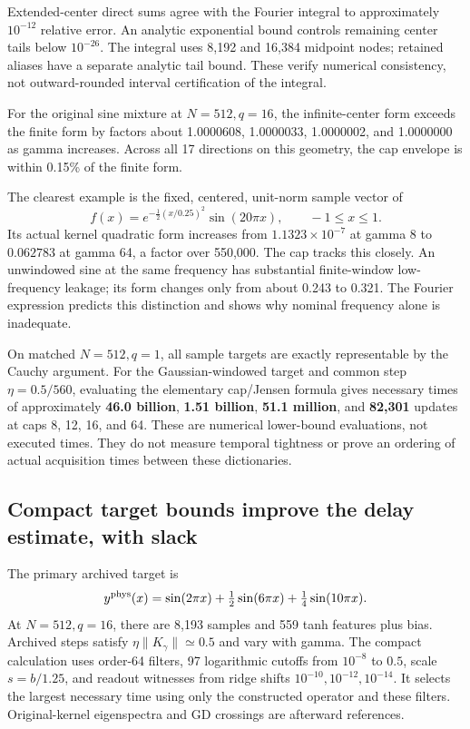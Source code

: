 \documentclass[11pt]{article}
\theoremstyle{definition}
\begin{document}
Extended-center direct sums agree with the Fourier integral to
approximately $10^{-12}$ relative error. An analytic exponential bound
controls remaining center tails below $10^{-26}$. The integral uses
8,192 and 16,384 midpoint nodes; retained aliases have a separate
analytic tail bound. These verify numerical consistency, not
outward-rounded interval certification of the integral.

For the original sine mixture at $N=512,q=16$, the infinite-center form
exceeds the finite form by factors about 1.0000608, 1.0000033,
1.0000002, and 1.0000000 as gamma increases. Across all 17 directions
on this geometry, the cap envelope is within 0.15\% of the finite form.

The clearest example is the fixed, centered, unit-norm sample vector of
\[
f(x)=e^{-\frac12(x/0.25)^2}\sin(20\pi x),\qquad -1\le x\le1.
\]
Its actual kernel quadratic form increases from $1.1323\times10^{-7}$
at gamma 8 to $0.062783$ at gamma 64, a factor over 550,000. The cap
tracks this closely. An unwindowed sine at the same frequency has
substantial finite-window low-frequency leakage; its form changes only
from about 0.243 to 0.321. The Fourier expression predicts this
distinction and shows why nominal frequency alone is inadequate.

On matched $N=512,q=1$, all sample targets are exactly representable
by the Cauchy argument. For the Gaussian-windowed target and common
step $\eta=0.5/560$, evaluating the elementary cap/Jensen formula gives
necessary times of approximately \textbf{46.0 billion}, \textbf{1.51
billion}, \textbf{51.1 million}, and \textbf{82,301} updates at caps
8, 12, 16, and 64. These are numerical lower-bound evaluations, not
executed times. They do not measure temporal tightness or prove an
ordering of actual acquisition times between these dictionaries.

\subsection*{Compact target bounds improve the delay estimate, with slack}
The primary archived target is
\[
y^{\rm phys}(x)=\sin(2\pi x)+\tfrac12\sin(6\pi x)+\tfrac14\sin(10\pi x).
\]
At $N=512,q=16$, there are 8,193 samples and 559 tanh features plus
bias. Archived steps satisfy $\eta\|K_\gamma\|\simeq0.5$ and vary with
gamma. The compact calculation uses order-64 filters, 97 logarithmic
cutoffs from $10^{-8}$ to $0.5$, scale $s=b/1.25$, and readout witnesses
from ridge shifts $10^{-10},10^{-12},10^{-14}$. It selects the largest
necessary time using only the constructed operator and these filters.
Original-kernel eigenspectra and GD crossings are afterward references.
\end{document}
